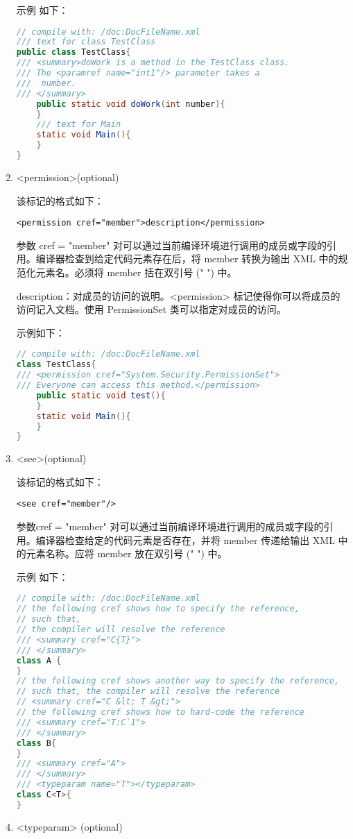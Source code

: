 \begin{enumerate}
示例 如下：
\begin{lstlisting}[language=java]
// compile with: /doc:DocFileName.xml 
/// text for class TestClass
public class TestClass{
/// <summary>doWork is a method in the TestClass class.  
/// The <paramref name="int1"/> parameter takes a 
///  number.
/// </summary>
    public static void doWork(int number){ 
    }
    /// text for Main
    static void Main(){ 
    }
}
\end{lstlisting}

\item <permission>(optional)

该标记的格式如下：
\begin{lstlisting}
<permission cref="member">description</permission>
\end{lstlisting}
参数 cref = "member" 对可以通过当前编译环境进行调用的成员或字段的引用。编译器检查到给定代码元素存在后，将 member 转换为输出 XML 中的规范化元素名。必须将 member 括在双引号 (" ") 中。

description：对成员的访问的说明。<permission> 标记使得你可以将成员的访问记入文档。使用 PermissionSet 类可以指定对成员的访问。

示例如下：
\begin{lstlisting}[language=java]
// compile with: /doc:DocFileName.xml 
class TestClass{
/// <permission cref="System.Security.PermissionSet">
/// Everyone can access this method.</permission>
    public static void test(){ 
    }	
    static void Main(){ 
    }
}
\end{lstlisting}
\item <see>(optional)

该标记的格式如下：
\begin{lstlisting}
<see cref="member"/>
\end{lstlisting}
参数cref = "member" 对可以通过当前编译环境进行调用的成员或字段的引用。编译器检查给定的代码元素是否存在，并将 member 传递给输出 XML 中的元素名称。应将 member 放在双引号 (" ") 中。

示例 如下：
\begin{lstlisting}[language=java]
// compile with: /doc:DocFileName.xml 
// the following cref shows how to specify the reference, 
// such that,
// the compiler will resolve the reference
/// <summary cref="C{T}">
/// </summary>
class A { 
}
// the following cref shows another way to specify the reference, 
// such that, the compiler will resolve the reference
// <summary cref="C &lt; T &gt;">
// the following cref shows how to hard-code the reference
/// <summary cref="T:C`1">
/// </summary>
class B{ 
}
/// <summary cref="A">
/// </summary>
/// <typeparam name="T"></typeparam>
class C<T>{ 
}
\end{lstlisting}
\item <typeparam> (optional)


\end{enumerate}
